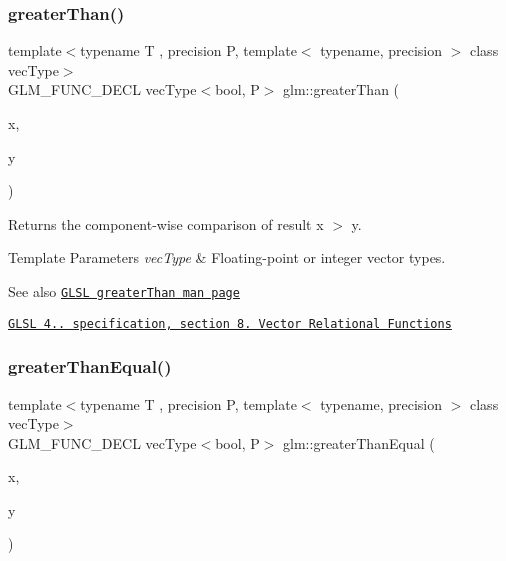 \subsubsection{\texorpdfstring{greater\+Than()}{greaterThan()}}
{\footnotesize\ttfamily template$<$typename T , precision P, template$<$ typename, precision $>$ class vec\+Type$>$ \\
G\+L\+M\+\_\+\+F\+U\+N\+C\+\_\+\+D\+E\+CL vec\+Type$<$bool, P$>$ glm\+::greater\+Than (\begin{DoxyParamCaption}\item[{vec\+Type$<$ T, P $>$ const \&}]{x,  }\item[{vec\+Type$<$ T, P $>$ const \&}]{y }\end{DoxyParamCaption})}

Returns the component-\/wise comparison of result x $>$ y.


\begin{DoxyTemplParams}{Template Parameters}
{\em vec\+Type} & Floating-\/point or integer vector types.\\
\hline
\end{DoxyTemplParams}
\begin{DoxySeeAlso}{See also}
\href{http://www.opengl.org/sdk/docs/manglsl/xhtml/greaterThan.xml}{\tt G\+L\+SL greater\+Than man page} 

\href{http://www.opengl.org/registry/doc/GLSLangSpec.4.20.8.pdf}{\tt G\+L\+SL 4.. specification, section 8. Vector Relational Functions} 
\end{DoxySeeAlso}
\mbox{\label{group__core__func__vector__relational_gaee7e101f8cc4ea43924f14dcdeb2ef26}} 
\subsubsection{\texorpdfstring{greater\+Than\+Equal()}{greaterThanEqual()}}
{\footnotesize\ttfamily template$<$typename T , precision P, template$<$ typename, precision $>$ class vec\+Type$>$ \\
G\+L\+M\+\_\+\+F\+U\+N\+C\+\_\+\+D\+E\+CL vec\+Type$<$bool, P$>$ glm\+::greater\+Than\+Equal (\begin{DoxyParamCaption}\item[{vec\+Type$<$ T, P $>$ const \&}]{x,  }\item[{vec\+Type$<$ T, P $>$ const \&}]{y }\end{DoxyParamCaption})}

